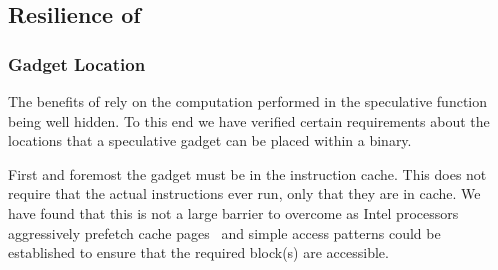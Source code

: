 %
%
%

\subsection{Resilience of \speculake}
%

\subsubsection{Gadget Location}
The benefits of \speculake rely on the computation performed in the
speculative function being well hidden. To this end we have verified 
certain requirements about the locations that a speculative gadget can 
be placed within a binary. 

First and foremost the gadget must be in the instruction cache. 
This does not require that the actual instructions ever run,
 only that they are in cache. We have 
found that this is not a large barrier to overcome as Intel 
processors aggressively prefetch cache pages~\cite{measuring-cache}
and simple access patterns could be established to ensure
that the required block(s) are accessible. 

